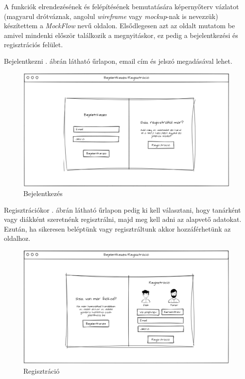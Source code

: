 
A funkciók elrendezésének és felépítésének bemutatására képernyőterv vázlatot (magyarul drótváznak, angolul \textit{wireframe} vagy \textit{mockup}-nak is nevezzük) készítettem a \textit{MockFlow} \cite{mockflow} nevű oldalon.
Elsődlegesen azt az oldalt mutatom be amivel mindenki először találkozik a megnyitáskor, ez pedig a bejelentkezési és regisztrációs felület.


Bejelentkezni . ábrán látható űrlapon, email cím és jelszó megadásával lehet.

\begin{figure}[h!]
    \centering
    \includegraphics[width=\linewidth]{images/login_wireframe.png}
    \caption{Bejelentkezés}
    \label{fig:login_wireframe}
\end{figure}

Regisztrációkor . ábrán látható űrlapon pedig ki kell választani, hogy tanárként vagy diákként szeretnénk regisztrálni, majd meg kell adni az alapvető adatokat.
Ezután, ha sikeresen beléptünk vagy regisztráltunk akkor hozzáférhetünk az oldalhoz.

\begin{figure}[H]
    \centering
    \includegraphics[width=\linewidth]{images/signin_wireframe.png}
    \caption{Regisztráció}
    \label{fig:signin_wireframe}
\end{figure}

